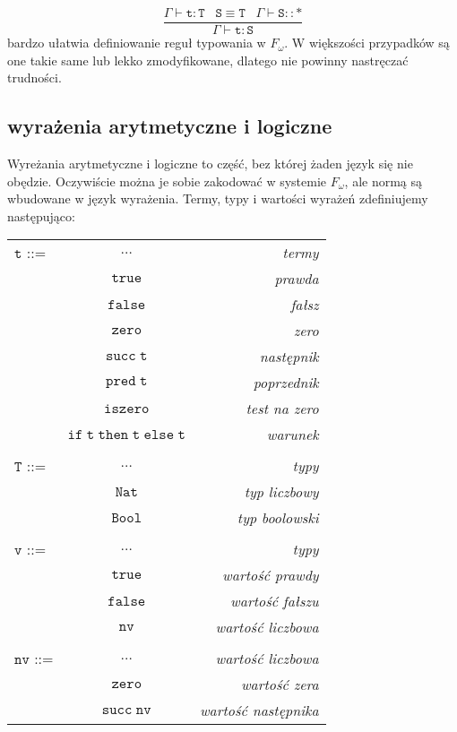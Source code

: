 \documentclass[11pt,leqno]{article}
\begin{document}
 	\[\mathtt{ \frac{\Gamma \vdash t:T \;\;\; S\equiv T \;\;\; \Gamma \vdash S::\ast}{\Gamma \vdash t:S}
		}
	\]
bardzo ułatwia definiowanie reguł typowania w $F_\omega$. W większości przypadków są one takie same lub
lekko zmodyfikowane, dlatego nie powinny nastręczać trudności.

\subsection{wyrażenia arytmetyczne i logiczne}

Wyreżania arytmetyczne i logiczne to część, bez której żaden język się nie obędzie. Oczywiście można je sobie zakodować w systemie $F_\omega$, ale normą są wbudowane w język wyrażenia. Termy, typy i wartości wyrażeń zdefiniujemy następująco: \\

\begin{tabular}{| l c r |}
  \hline
  $\mathtt{t}$ ::= & $\dots$ & \textit{termy}  \\
   & $\mathtt{true}$ & \textit{prawda}  \\
   & $\mathtt{false}$ & \textit{fałsz} \\
   & $\mathtt{zero}$ & \textit{zero} \\
   & $\mathtt{succ\;t}$ & \textit{następnik}  \\
   & $\mathtt{pred\;t}$ & \textit{poprzednik} \\
   & $\mathtt{iszero}$ & \textit{test na zero} \\
   & $\mathtt{if\;t\;then\;t\;else\;t}$ & \textit{warunek} \\
   & & \\
  $\mathtt{T}$ ::= & $\dots$ & \textit{typy} \\
   & $\mathtt{Nat}$ & \textit{typ liczbowy} \\
   & $\mathtt{Bool}$ & \textit{typ boolowski} \\
   & & \\
  $\mathtt{v}$ ::= & $\dots$ & \textit{typy} \\
   & $\mathtt{true}$ & \textit{wartość prawdy} \\
   & $\mathtt{false}$ & \textit{wartość fałszu} \\
   & $\mathtt{nv}$ & \textit{wartość liczbowa} \\
   & & \\
  $\mathtt{nv}$ ::= & $\dots$ & \textit{wartość liczbowa} \\
   & $\mathtt{zero}$ & \textit{wartość zera} \\
   & $\mathtt{succ\;nv}$ & \textit{wartość następnika} \\
  \hline
\end{tabular} \\
\end{document}
